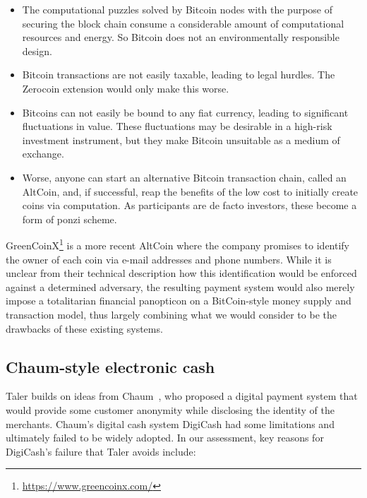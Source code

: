 \documentclass{llncs}
\begin{document}
\begin{itemize}
  \item The computational puzzles solved by Bitcoin nodes with the purpose
    of securing the block chain consume a considerable amount of computational
    resources and energy.  So Bitcoin does not an environmentally responsible
    design.
  \item Bitcoin transactions are not easily taxable, leading to legal hurdles.
    The Zerocoin extension would only make this worse.
  \item Bitcoins can not easily be bound to any fiat currency, leading to
    significant fluctuations in value.  These fluctuations may be desirable in
    a high-risk investment instrument, but they make Bitcoin unsuitable as
    a medium of exchange.
  \item Worse, anyone can start an alternative Bitcoin transaction chain,
    called an AltCoin, and, if successful, reap the benefits of the low
    cost to initially create coins via computation.  As participants are
    de facto investors, these become a form of ponzi scheme.
\end{itemize}

GreenCoinX\footnote{\url{https://www.greencoinx.com/}} is a more
recent AltCoin where the company promises to identify the owner of
each coin via e-mail addresses and phone numbers.  While it is unclear
from their technical description how this identification would be
enforced against a determined adversary, the resulting payment system
would also merely impose a totalitarian financial panopticon on a
BitCoin-style money supply and transaction model, thus largely
combining what we would consider to be the drawbacks of these existing
systems.

\subsection{Chaum-style electronic cash}

Taler builds on ideas from Chaum~\cite{chaum1983blind}, who proposed a
digital payment system that would provide some customer anonymity
while disclosing the identity of the merchants.  Chaum's digital cash
system DigiCash had some limitations and ultimately failed to be widely
adopted.  In our assessment, key reasons for DigiCash's failure that
Taler avoids include:
\end{document}
